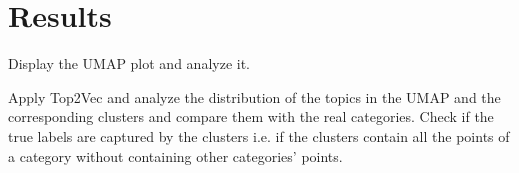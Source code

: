 \documentclass[a4paper]{article}
\begin{document}
\section* {Results}

Display the UMAP plot and analyze it.

Apply Top2Vec and analyze the distribution of the topics in the UMAP and the corresponding clusters and compare them with the real categories. Check if the true labels are captured by the clusters i.e. if the clusters contain all the points of a category without containing other categories' points.











\end{document}
